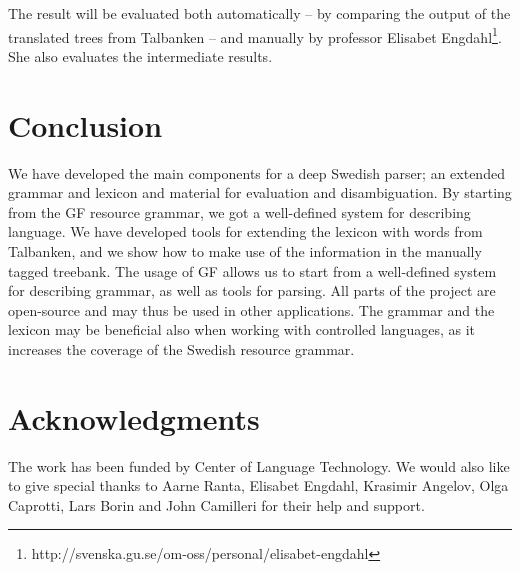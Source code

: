 \documentclass[10pt, a4paper]{article}
\begin{document}

The result will be evaluated both automatically -- by comparing the output of
the translated trees from Talbanken -- and manually by professor Elisabet Engdahl\footnote{http://svenska.gu.se/om-oss/personal/elisabet-engdahl}.
She also evaluates the intermediate results.

\section{Conclusion}
We have developed the main components
for a deep Swedish parser; an extended grammar and lexicon and material for
evaluation and disambiguation.
By starting from the GF resource grammar, we got a well-defined system for
describing language. 
We have developed tools for extending the lexicon with words from Talbanken,
and we show how to make use of the information in the manually tagged
treebank.
The usage of GF allows us to start from
a well-defined system for describing grammar, as well as tools for
parsing.
All parts of the project are open-source and may thus be used in other applications.
The grammar and the lexicon may be beneficial also when working with controlled languages,
as it increases the coverage of the Swedish resource grammar.


\section{Acknowledgments}
The work has been funded by Center of Language Technology.
We would also like to give special thanks to Aarne Ranta,
Elisabet Engdahl, Krasimir Angelov, Olga Caprotti, Lars Borin and John Camilleri for their help
and support.



\end{document}
